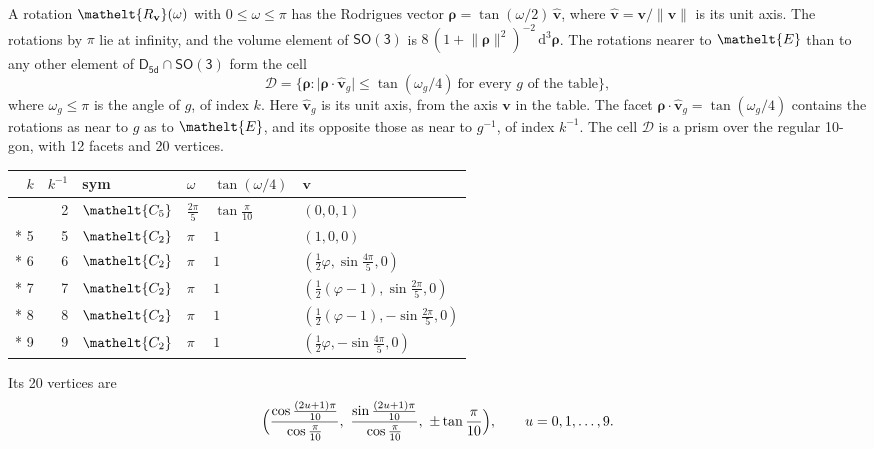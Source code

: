 \documentclass[10pt,a4paper]{article}
\numberwithin{equation}{section}
\newcommand{\eltfont}[1]{{\let\sigma\eltsigma\mathelt{#1}}}
\newcommand{\grp}[1]{\mathsf{#1}}
\newcommand{\cls}[1]{\eltfont{#1}}
\newcommand{\elt}[1]{\eltfont{#1}}
\newcommand{\dirvec}[3]{(#1, #2, #3)}
\newcommand{\unitaxis}{\hat{\mathbf{v}}}
\newcommand{\vv}{\mathbf{v}}
\newcommand{\diff}{\mathrm{d}}
\newcommand{\goldenratio}{\varphi}
\newcommand{\rodrigues}{\boldsymbol{\rho}}
\newcommand{\fcell}{\mathcal{D}}
\begin{document}
\leavevmode\label{n:vector.rodrigues}\label{n:vector.unitaxis}A rotation $\elt{R_{\vv}}(\omega)$ with $0 \le \omega \le \pi$ has the Rodrigues vector $\rodrigues = \tan(\omega/2)\,\unitaxis$, where $\unitaxis = \vv/\lVert\vv\rVert$ is its unit axis. The rotations by $\pi$ lie at infinity, and the volume element of \href{SO3.pdf}{$\grp{SO(3)}$} is $8\,(1 + \lVert\rodrigues\rVert^2)^{-2}\,\diff^3\rodrigues$.
\leavevmode\label{n:set.cell}The rotations nearer to $\elt{E}$ than to any other element of $\grp{D_{5d}} \cap \grp{SO(3)}$ form the cell
\begin{equation}\label{e:cell}\fcell = \bigl\{\rodrigues : \lvert\rodrigues\cdot\unitaxis_g\rvert \le \tan(\omega_g/4)\ \text{for every $g$ of the table}\bigr\},\end{equation}
where $\omega_g \le \pi$ is the angle of $g$, of index $k$. Here $\unitaxis_g$ is its unit axis, from the axis $\vv$ in the table. The facet $\rodrigues\cdot\unitaxis_g = \tan(\omega_g/4)$ contains the rotations as near to $g$ as to $\elt{E}$, and its opposite those as near to $g^{-1}$, of index $k^{-1}$. The cell $\fcell$ is a prism over the regular 10-gon, with 12 facets and 20 vertices.
{\small{\renewcommand{\arraystretch}{1.3}\begin{longtable}{@{}rrllll@{}}\toprule
$k$ & $k^{-1}$ & sym & $\omega$ & $\tan(\omega/4)$ & $\vv$\\\midrule\endhead
\bottomrule\endfoot\endlastfoot
1 & 2 & $\cls{C_{5}}$ & $\tfrac{2\pi}{5}$ & $\tan\tfrac{\pi}{10}$ & $\dirvec{0}{0}{1}$\\*
5 & 5 & $\cls{C_{2}}$ & $\pi$ & $1$ & $\dirvec{1}{0}{0}$\\*
6 & 6 & $\cls{C_{2}}$ & $\pi$ & $1$ & $\dirvec{\tfrac{1}{2}\goldenratio{}}{\sin\tfrac{4\pi}{5}}{0}$\\*
7 & 7 & $\cls{C_{2}}$ & $\pi$ & $1$ & $\dirvec{\tfrac{1}{2}(\goldenratio - 1)}{\sin\tfrac{2\pi}{5}}{0}$\\*
8 & 8 & $\cls{C_{2}}$ & $\pi$ & $1$ & $\dirvec{\tfrac{1}{2}(\goldenratio - 1)}{-\sin\tfrac{2\pi}{5}}{0}$\\*
9 & 9 & $\cls{C_{2}}$ & $\pi$ & $1$ & $\dirvec{\tfrac{1}{2}\goldenratio{}}{-\sin\tfrac{4\pi}{5}}{0}$\\
\bottomrule\end{longtable}}}
\leavevmode\label{n:local.vertex.u}Its 20 vertices are
\begin{equation}\label{e:prism}\Bigl(\frac{\cos\frac{(2u+1)\pi}{10}}{\cos\frac{\pi}{10}},\ \frac{\sin\frac{(2u+1)\pi}{10}}{\cos\frac{\pi}{10}},\ \pm\tan\frac{\pi}{10}\Bigr),\qquad u = 0, 1, \dots, 9.\end{equation}
\end{document}

